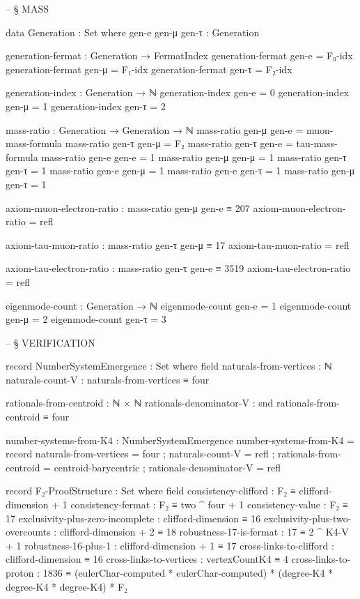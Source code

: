 \documentclass[11pt,a4paper]{book}
\begin{document}
\begin{code}
-- § MASS

data Generation : Set where
  gen-e gen-μ gen-τ : Generation

generation-fermat : Generation → FermatIndex
generation-fermat gen-e = F₀-idx
generation-fermat gen-μ = F₁-idx
generation-fermat gen-τ = F₂-idx

generation-index : Generation → ℕ
generation-index gen-e = 0
generation-index gen-μ = 1
generation-index gen-τ = 2

mass-ratio : Generation → Generation → ℕ
mass-ratio gen-μ gen-e = muon-mass-formula
mass-ratio gen-τ gen-μ = F₂
mass-ratio gen-τ gen-e = tau-mass-formula
mass-ratio gen-e gen-e = 1
mass-ratio gen-μ gen-μ = 1
mass-ratio gen-τ gen-τ = 1
mass-ratio gen-e gen-μ = 1
mass-ratio gen-e gen-τ = 1
mass-ratio gen-μ gen-τ = 1

axiom-muon-electron-ratio : mass-ratio gen-μ gen-e ≡ 207
axiom-muon-electron-ratio = refl

axiom-tau-muon-ratio : mass-ratio gen-τ gen-μ ≡ 17
axiom-tau-muon-ratio = refl

axiom-tau-electron-ratio : mass-ratio gen-τ gen-e ≡ 3519
axiom-tau-electron-ratio = refl

eigenmode-count : Generation → ℕ
eigenmode-count gen-e = 1
eigenmode-count gen-μ = 2
eigenmode-count gen-τ = 3


-- § VERIFICATION

record NumberSystemEmergence : Set where
  field
    naturals-from-vertices : ℕ
    naturals-count-V : naturals-from-vertices ≡ four
    
    rationals-from-centroid : ℕ × ℕ
    rationals-denominator-V : snd rationals-from-centroid ≡ four

number-systems-from-K4 : NumberSystemEmergence
number-systems-from-K4 = record
  { naturals-from-vertices = four
  ; naturals-count-V = refl
  ; rationals-from-centroid = centroid-barycentric
  ; rationals-denominator-V = refl
  }

record F₂-ProofStructure : Set where
  field
    consistency-clifford : F₂ ≡ clifford-dimension + 1
    consistency-fermat : F₂ ≡ two ^ four + 1
    consistency-value : F₂ ≡ 17
    exclusivity-plus-zero-incomplete : clifford-dimension ≡ 16
    exclusivity-plus-two-overcounts : clifford-dimension + 2 ≡ 18
    robustness-17-is-fermat : 17 ≡ 2 ^ K4-V + 1
    robustness-16-plus-1 : clifford-dimension + 1 ≡ 17
    cross-links-to-clifford : clifford-dimension ≡ 16
    cross-links-to-vertices : vertexCountK4 ≡ 4
    cross-links-to-proton : 1836 ≡ (eulerChar-computed * eulerChar-computed) * (degree-K4 * degree-K4 * degree-K4) * F₂


\end{code}
\end{document}
